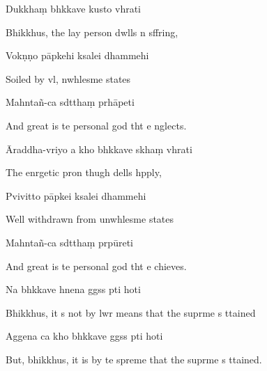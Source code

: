 Dukkhaṃ bhkkave kusto vhrati

\begin{english}
  Bhikkhus, the lay person dwlls n sffring,
\end{english}

Vokṇṇo pāpkehi ksalei dhammehi

\begin{english}
  Soiled by vl, nwhlesme states
\end{english}

Mahntañ-ca sdtthaṃ prhāpeti

\begin{english}
  And great is te personal god tht e nglects.
\end{english}

Āraddha-vriyo a kho bhkkave skhaṃ vhrati

\begin{english}
  The enrgetic pron thugh dells hpply,
\end{english}

Pvivitto pāpkei ksalei dhammehi

\begin{english}
  Well withdrawn from unwhlesme states
\end{english}

Mahntañ-ca sdtthaṃ prpūreti

\begin{english}
  And great is te personal god tht e chieves.
\end{english}

Na bhkkave hnena ggss pti hoti

\begin{english}
  Bhikkhus, it s not by lwr means that the suprme s ttained
\end{english}

Aggena ca kho bhkkave ggss pti hoti

\begin{english}
  But, bhikkhus, it is by te spreme that the suprme s ttained.
\end{english}

